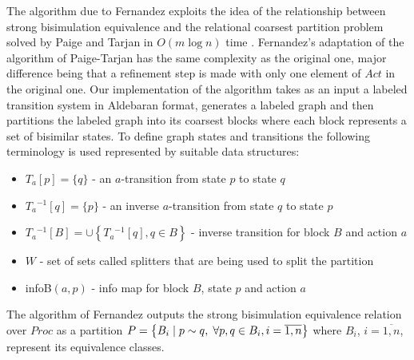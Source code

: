 The algorithm due to Fernandez exploits the idea of the relationship between strong bisimulation equivalence 
and the relational coarsest partition problem \cite{KanellakisSmolka} solved by Paige and Tarjan in $O(m \log n)$ time \cite{PaigeTarjan}. Fernandez's adaptation of the algorithm of Paige-Tarjan has the same complexity as the original one, major difference being that a refinement step is made with only one element of $Act$ in the original one. Our implementation of the algorithm takes as an input a labeled transition system in Aldebaran format, generates a labeled graph and then partitions the labeled graph into its coarsest blocks where each block represents a set of bisimilar states. To define graph states 
and transitions the following terminology is used represented by suitable data structures: 
\begin{itemize}
	\item $T_a[p]=\{q\}$ - an $a$-transition from state $p$ to state $q$
	\item $T_a{}^{-1}[q]=\{p\}$ - an inverse $a$-transition from state $q$ to state $p$
	\item $T_a{}^{-1}[B]=\cup \left\{T_a{}^{-1}[q],q\in B\right\}$ - inverse transition for block $B$ and action $a$
	\item $W$ - set of sets called splitters that are being used to split the partition
	\item infoB$(a, p)$ - info map for block $B$, state $p$ and action $a$
\end{itemize}

The algorithm of Fernandez outputs the strong bisimulation equivalence relation over $\mathit{Proc}$ as a partition $P = \left\{B_{i}\hspace{1mm}|\hspace{1mm} p\sim q,\hspace{1mm} \forall p,q\in B_{i}, i=\overline{1,n} \right\}$ where $B_{i}$, $i=\overline{1,n}$, represent its equivalence classes.


